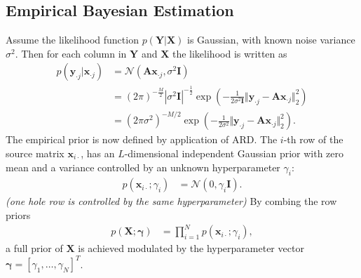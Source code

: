 \subsection{Empirical Bayesian Estimation}
Assume the likelihood function $p(\mathbf{Y} \vert \mathbf{X})$ is Gaussian, with known noise variance $\sigma^2$. 
Then for each column in $\mathbf{Y}$ and $\mathbf{X}$ the likelihood is written as
\begin{align*}
p(\mathbf{y}_{\cdot j} \vert \mathbf{x}_{\cdot j}) &= \mathcal{N}(\mathbf{Ax}_{\cdot j}, \sigma^2 \mathbf{I}) \\
&= (2 \pi)^{-\frac{M}{2}}|\sigma^2\mathbf{I}|^{-\frac{1}{2}}\exp \left( -\frac{1}{2 \sigma^2\mathbf{I}} \Vert \mathbf{y}_{\cdot j} - \mathbf{A} \mathbf{x}_{\cdot j} \Vert_2^2 \right)\\
&= (2 \pi \sigma^2)^{-M/2} \exp \left( - \frac{1}{2 \sigma^2} \Vert \mathbf{y}_{\cdot j} - \mathbf{A} \mathbf{x}_{\cdot j} \Vert_2^2 \right).
\end{align*}   
The empirical prior is now defined by application of ARD. 
The $i$-th row of the source matrix $\mathbf{x}_{i \cdot}$, has an $L$-dimensional independent Gaussian prior with zero mean and a variance controlled by an unknown hyperparameter $\gamma_i$:
\begin{align*}
p (\mathbf{x}_{i \cdot} ; \gamma_i) &= \mathcal{N}(0, \gamma_i \mathbf{I}).
\end{align*}
\textit{(one hole row is controlled by the same hyperparameter)}
By combing the row priors
\begin{align*}
p (\mathbf{X} ; \boldsymbol{\gamma}) &= \prod_{i=1}^N p (\mathbf{x}_{i \cdot} ; \gamma_i),
\end{align*}
a full prior of $\mathbf{X}$ is achieved modulated by the hyperparameter vector $\boldsymbol{\gamma} = [\gamma_1, \dots, \gamma_N]^T$. 
